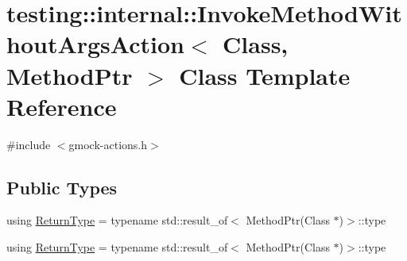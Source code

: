 \hypertarget{structtesting_1_1internal_1_1_invoke_method_without_args_action}{}\section{testing\+::internal\+::Invoke\+Method\+Without\+Args\+Action$<$ Class, Method\+Ptr $>$ Class Template Reference}
\label{structtesting_1_1internal_1_1_invoke_method_without_args_action}


{\ttfamily \#include $<$gmock-\/actions.\+h$>$}

\subsection*{Public Types}
\begin{DoxyCompactItemize}
\item 
using \mbox{\hyperlink{structtesting_1_1internal_1_1_invoke_method_without_args_action_ad1acb81830c5636daf7c6d44064b4e58}{Return\+Type}} = typename std\+::result\+\_\+of$<$ Method\+Ptr(Class $\ast$)$>$\+::type
\item 
using \mbox{\hyperlink{structtesting_1_1internal_1_1_invoke_method_without_args_action_ad1acb81830c5636daf7c6d44064b4e58}{Return\+Type}} = typename std\+::result\+\_\+of$<$ Method\+Ptr(Class $\ast$)$>$\+::type
\end{DoxyCompactItemize}

